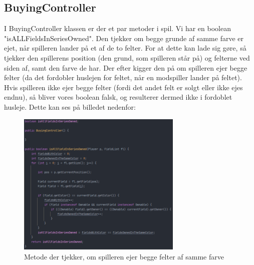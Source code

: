 \subsection{BuyingController}
I BuyingController klassen er der et par metoder i spil. Vi har en boolean "isALLFieldsInSeriesOwned". Den tjekker om begge grunde af samme farve er ejet, når spilleren lander på et af de to felter. For at dette kan lade sig gøre, så tjekker den spillerens position (den grund, som spilleren står på) og felterne ved siden af, samt den farve de har. Der efter kigger den på om spilleren ejer begge felter (da det fordobler huslejen for feltet, når en modspiller lander på feltet). Hvis spilleren ikke ejer begge felter (fordi det andet felt er solgt eller ikke ejes endnu), så bliver vores boolean falsk, og resulterer dermed ikke i fordoblet husleje. Dette kan ses på billedet nedenfor:

\begin{figure}[H]
    \centering
    \includegraphics[width=0.7\textwidth]{sources/7_implementering/BuyingController.PNG}
    \caption{Metode der tjekker, om spilleren ejer begge felter af samme farve}
    \label{fig:chance}
\end{figure}

